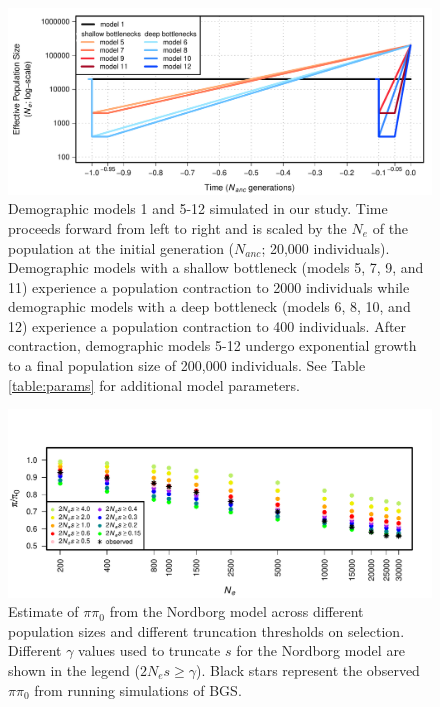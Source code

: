 \documentclass[9pt,twocolumn,twoside]{rilabRxiv}
\begin{document}
\begin{figure}[t]
\includegraphics[width=0.8\linewidth]{figures/FigS2.pdf}
\caption{Demographic models 1 and 5-12 simulated in our study.
Time proceeds forward from left to right and is scaled by the $N_e$ of the population at the initial generation ($N_{anc}$; 20,000 individuals).
Demographic models with a shallow bottleneck (models 5, 7, 9, and 11) experience a population contraction to 2000 individuals while demographic models with a deep bottleneck (models 6, 8, 10, and 12) experience a population contraction to 400 individuals.
After contraction, demographic models 5-12 undergo exponential growth to a final population size of 200,000 individuals.
See Table \ref{table:params} for additional model parameters.}
\label{fig:S2}
\end{figure}
\pagebreak

\begin{figure}[t]
\includegraphics[width=.9\linewidth]{figures/FigS21.pdf}
\caption{Estimate of $\pi\pi_0$ from the Nordborg model across different population sizes and different truncation thresholds on selection.
Different $\gamma$ values used to truncate $s$ for the Nordborg model are shown in the legend ($2N_es \geq \gamma$).
Black stars represent the observed $\pi\pi_0$ from running simulations of BGS.}
\label{fig:nordborgsims}
\end{figure}
\pagebreak
\end{document}
